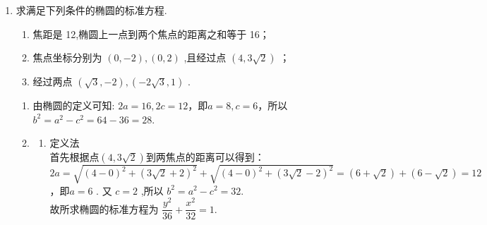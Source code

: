 \begin{enumerate}
\begin{jieda}
        当 ${2a} = \left| {{F}_{1}{F}_{2}}\right|$ ,即 $a = 4$ 时,轨迹是线段 ${F}_{1}{F}_{2}$ ,轨迹方程为 $y = 0\left( {-4 \leq  x \leq  4}\right)$ .
        
        当 ${2a} < \left| {{F}_{1}{F}_{2}}\right|$ ,即 $0 < a < 4$ 时,轨迹不存在. \\
        \ps 只说平面内到两点的距离为定值是不足以判断出是点的轨迹是椭圆，一定要加上对于定值的约束.
    \end{jieda}
    \item 求满足下列条件的椭圆的标准方程.
    \begin{enumerate}
        \item 焦距是 12,椭圆上一点到两个焦点的距离之和等于 16；
        \item 焦点坐标分别为 $\left( {0, - 2}\right) ,\left( {0,2}\right)$ ,且经过点 $\left( {4,3\sqrt{2}}\right)$ ；
        \item 经过两点 $\left( {\sqrt{3}, - 2}\right) ,\left( {-2\sqrt{3},1}\right)$ .
    \end{enumerate}
    \begin{jieda}
        \begin{enumerate}
            \item 由椭圆的定义可知: ${2a} = {16},{2c} = {12}$，即$a = 8, c = 6$，所以 ${b}^{2} = {a}^{2} - {c}^{2} = {64} - {36} = {28}$. 
        \item 
            \begin{enumerate}
                \item 定义法 \\
                首先根据点$\left( {4,3\sqrt{2}}\right)$到两焦点的距离可以得到：\\
                ${2a} = \sqrt{{\left( 4 - 0\right) }^{2} + {\left( 3\sqrt{2} + 2\right) }^{2}} + \sqrt{{\left( 4 - 0\right) }^{2} + {\left( 3\sqrt{2} - 2\right) }^{2}} = \left( {6 + \sqrt{2}}\right)  + \left( {6 - \sqrt{2}}\right)  = {12}$，即$a = 6$ . 又 $c = 2$ ,所以 ${b}^{2} = {a}^{2} - {c}^{2} = {32}$. \\
                故所求椭圆的标准方程为 $\dfrac{{y}^{2}}{36} + \dfrac{{x}^{2}}{32} = 1$.

\end{enumerate}
\end{enumerate}
\end{jieda}
\end{enumerate}
